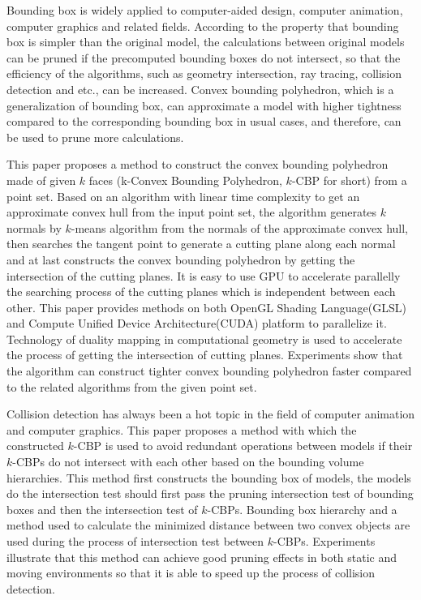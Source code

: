 \begin{eabstract} 
Bounding box is widely applied to computer-aided design, computer animation, computer graphics and related fields. 
According to the property that bounding box is simpler than the original model, the calculations between original models can be pruned if the precomputed bounding boxes do not intersect, so that the efficiency of the algorithms, such as geometry intersection, ray tracing, collision detection and etc., can be increased.
Convex bounding polyhedron, which is a generalization of bounding box,  can approximate a model with higher tightness compared to the corresponding bounding box in usual cases, and therefore, can be used to prune more calculations.

This paper proposes a method to construct the convex bounding polyhedron made of given $k$ faces (k-Convex Bounding Polyhedron, $k$-CBP for short) from a point set.
Based on an algorithm with linear time complexity to get an approximate convex hull from the input point set, 
the algorithm generates $k$ normals by $k$-means algorithm from the normals of the approximate convex hull,  
then searches the tangent point to generate a cutting plane along each normal and at last constructs the convex bounding polyhedron by getting the intersection of the cutting planes. 
It is easy to use GPU to accelerate parallelly the searching process of the cutting planes which is independent between each other. 
This paper provides methods on both OpenGL Shading Language(GLSL) and Compute Unified Device Architecture(CUDA) platform to parallelize it. 
Technology of duality mapping in computational geometry is used to accelerate the process of getting the intersection of cutting planes. 
Experiments show that the algorithm can construct tighter convex bounding polyhedron faster compared to the related algorithms from the given point set.

Collision detection has always been a hot topic in the field of computer animation and computer graphics. 
This paper proposes a method with which the constructed $k$-CBP is used to avoid redundant operations between models if their $k$-CBPs do not intersect with each other based on the bounding volume hierarchies.
This method first constructs the bounding box of models, the models do the intersection test should first pass the pruning intersection test of bounding boxes and then the intersection test of $k$-CBPs. 
Bounding box hierarchy and a method used to calculate the minimized distance between two convex objects are used during the process of intersection test between $k$-CBPs. 
Experiments illustrate that this method can achieve good pruning effects in both static and moving environments so that it is able to speed up the process of collision detection.

\end{eabstract}

